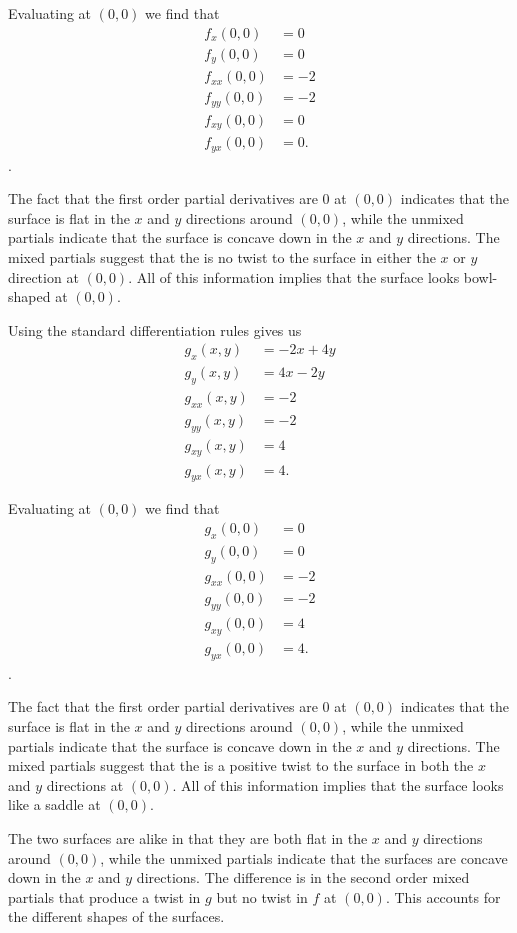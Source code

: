 \begin{exercises}
\begin{exerciseSolution}
	\item Evaluating at $(0,0)$ we find that
\begin{align*}
f_x(0,0) &= 0 \\
f_y(0,0) &= 0 \\
f_{xx}(0,0) &= -2 \\
f_{yy}(0,0) &= -2 \\
f_{xy}(0,0) &= 0 \\
f_{yx}(0,0) &= 0.
\end{align*}.
	\item The fact that the first order partial derivatives are 0 at $(0,0)$ indicates that the surface is flat in the $x$ and $y$ directions around $(0,0)$, while the unmixed partials indicate that the surface is concave down in the $x$ and $y$ directions. The mixed partials suggest that the is no twist to the surface in either the $x$ or $y$ direction at $(0,0)$. All of this information implies that the surface looks bowl-shaped at $(0,0)$.  
	\item Using the standard differentiation rules gives us
\begin{align*}
g_x(x,y) &= -2x+4y \\
g_y(x,y) &= 4x-2y \\
g_{xx}(x,y) &= -2 \\
g_{yy}(x,y) &= -2 \\
g_{xy}(x,y) &= 4 \\
g_{yx}(x,y) &= 4.
\end{align*}

	\item Evaluating at $(0,0)$ we find that
\begin{align*}
g_x(0,0) &= 0 \\
g_y(0,0) &= 0 \\
g_{xx}(0,0) &= -2 \\
g_{yy}(0,0) &= -2 \\
g_{xy}(0,0) &= 4 \\
g_{yx}(0,0) &= 4.
\end{align*}.
	\item The fact that the first order partial derivatives are 0 at $(0,0)$ indicates that the surface is flat in the $x$ and $y$ directions around $(0,0)$, while the unmixed partials indicate that the surface is concave down in the $x$ and $y$ directions. The mixed partials suggest that the is a positive  twist to the surface in both the $x$ and $y$ directions at $(0,0)$. All of this information implies that the surface looks like a saddle at $(0,0)$.  
	\item The two surfaces are alike in that they are both flat in the $x$ and $y$ directions around $(0,0)$, while the unmixed partials indicate that the surfaces are concave down in the $x$ and $y$ directions. The difference is in the second order mixed partials that produce a twist in $g$ but no twist in $f$ at $(0,0)$. This accounts for the different shapes of the surfaces. 
    \ea
\end{exerciseSolution}



\end{exercises}
